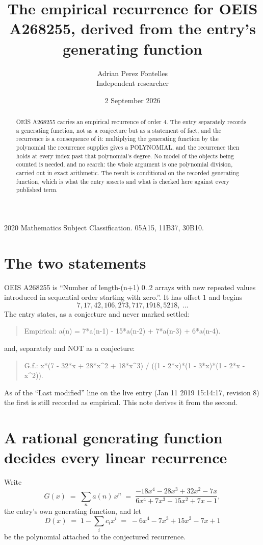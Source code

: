 \documentclass[11pt,a4paper]{article}
\title{The empirical recurrence for OEIS A268255, derived from the entry's generating function}
\author{Adrian Perez Fontelles\\ \small Independent researcher}
\date{2 September 2026}
\theoremstyle{plain}
\theoremstyle{definition}
\begin{document}
\maketitle

\begin{abstract}
OEIS A268255 carries an empirical recurrence of order $4$. The entry separately records a
generating function, not as a conjecture but as a statement of fact, and the recurrence is a
consequence of it: multiplying the generating function by the polynomial the recurrence
supplies gives a POLYNOMIAL, and the recurrence then holds at every index past that
polynomial's degree. No model of the objects being counted is needed, and no search: the
whole argument is one polynomial division, carried out in exact arithmetic. The result is
conditional on the recorded generating function, which is what the entry asserts and what is
checked here against every published term.
\end{abstract}

\noindent\small 2020 Mathematics Subject Classification. 05A15, 11B37, 30B10.\normalsize

\section{The two statements}

OEIS A268255 is ``Number of length-(n+1) 0..2 arrays with new repeated values introduced in sequential order starting with zero.''. It has offset $1$ and begins
\[
7, 17, 42, 106, 273, 717, 1918, 5218,\ \dots
\]
The entry states, as a conjecture and never marked settled:
\begin{quote}
Empirical: a(n) = 7*a(n-1) - 15*a(n-2) + 7*a(n-3) + 6*a(n-4).
\end{quote}
and, separately and NOT as a conjecture:
\begin{quote}
G.f.: x*(7 - 32*x + 28*x\^{}2 + 18*x\^{}3) / ((1 - 2*x)*(1 - 3*x)*(1 - 2*x - x\^{}2)).
\end{quote}
As of the ``Last modified'' line on the live entry (Jan 11 2019 15:14:17, revision 8) the first is still
recorded as empirical. This note derives it from the second.

\section{A rational generating function decides every linear recurrence}

Write
\[
G(x)\;=\;\sum_{n}a(n)\,x^{n}\;=\;\frac{- 18 x^{4} - 28 x^{3} + 32 x^{2} - 7 x}{6 x^{4} + 7 x^{3} - 15 x^{2} + 7 x - 1},
\]
the entry's own generating function, and let
\[
D(x)\;=\;1-\sum_i c_i x^{i}\;=\;- 6 x^{4} - 7 x^{3} + 15 x^{2} - 7 x + 1
\]
be the polynomial attached to the conjectured recurrence.
\end{document}
